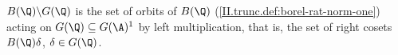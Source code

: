 $B(\Q)\backslash G(\Q)$ is the set of orbits of $B(\Q)$ (\cref{II.trunc.def:borel-rat-norm-one}) acting on $G(\Q)\subseteq G(\A)^1$ by left multiplication, that is,
the set of right cosets $B(\Q)\delta$, $\delta\in G(\Q)$.

